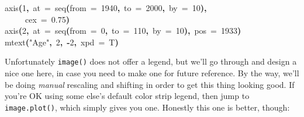 \documentclass[a4paper]{article}
\newcommand{\hlnumber}[1]{\textcolor[rgb]{0.0823529411764706,0.0784313725490196,0.709803921568627}{#1}}%
\newcommand{\hlfunctioncall}[1]{\textcolor[rgb]{1,0,0}{#1}}%
\newcommand{\hlstring}[1]{\textcolor[rgb]{0.6,0.6,1}{#1}}%
\newcommand{\hlkeyword}[1]{\textcolor[rgb]{0,0,0}{\textbf{#1}}}%
\newcommand{\hlargument}[1]{\textcolor[rgb]{0.694117647058824,0.247058823529412,0.0196078431372549}{#1}}%
\newcommand{\hlsymbol}[1]{\textcolor[rgb]{0,0,0}{#1}}%
\newcommand{\hlprompt}[1]{\textcolor[rgb]{0,0,0}{#1}}%
\newcommand{\hlstd}[1]{\textcolor[rgb]{0,0,0}{#1}}%
\newenvironment{Houtput}{\raggedright}{%
%
}
\begin{document}
\begin{Houtput}
\hlstd{}\ttfamily\noindent
\hlprompt{\usebox{\hlnormalsizeboxgreaterthan}{\ }}\hlfunctioncall{axis}\hlkeyword{(}\hlnumber{1}\hlkeyword{,}{\ }\hlargument{at}{\ }\hlargument{=}{\ }\hlfunctioncall{seq}\hlkeyword{(}\hlargument{from}{\ }\hlargument{=}{\ }\hlnumber{1940}\hlkeyword{,}{\ }\hlargument{to}{\ }\hlargument{=}{\ }\hlnumber{2000}\hlkeyword{,}{\ }\hlargument{by}{\ }\hlargument{=}{\ }\hlnumber{10}\hlkeyword{)}\hlkeyword{,}\hspace*{\fill}\\
\hlstd{}\hlprompt{{\ }}{\ }{\ }{\ }{\ }\hlargument{cex}{\ }\hlargument{=}{\ }\hlnumber{0.75}\hlkeyword{)}\mbox{}
\normalfont
\hspace*{\fill}\\
\hlstd{}\ttfamily\noindent
\hlprompt{\usebox{\hlnormalsizeboxgreaterthan}{\ }}\hlfunctioncall{axis}\hlkeyword{(}\hlnumber{2}\hlkeyword{,}{\ }\hlargument{at}{\ }\hlargument{=}{\ }\hlfunctioncall{seq}\hlkeyword{(}\hlargument{from}{\ }\hlargument{=}{\ }\hlnumber{0}\hlkeyword{,}{\ }\hlargument{to}{\ }\hlargument{=}{\ }\hlnumber{110}\hlkeyword{,}{\ }\hlargument{by}{\ }\hlargument{=}{\ }\hlnumber{10}\hlkeyword{)}\hlkeyword{,}{\ }\hlargument{pos}{\ }\hlargument{=}{\ }\hlnumber{1933}\hlkeyword{)}\mbox{}
\normalfont
\hspace*{\fill}\\
\hlstd{}\ttfamily\noindent
\hlprompt{\usebox{\hlnormalsizeboxgreaterthan}{\ }}\hlfunctioncall{mtext}\hlkeyword{(}\hlstring{"Age"}\hlkeyword{,}{\ }\hlnumber{2}\hlkeyword{,}{\ }\hlkeyword{-}\hlnumber{2}\hlkeyword{,}{\ }\hlargument{xpd}{\ }\hlargument{=}{\ }\hlsymbol{T}\hlkeyword{)}\mbox{}
\normalfont
\hspace*{\fill}\\
\hlstd{}
\end{Houtput}

Unfortunately \texttt{image()} does not offer a legend, but we'll go through and design a nice one here, in case you need to make one for future reference. By the way, we'll be doing \textit{manual} rescaling and shifting in order to get this thing looking good. If you're OK using some else's default color strip legend, then jump to \texttt{image.plot()}, which simply gives you one. Honestly this one is better, though:
\end{document}
